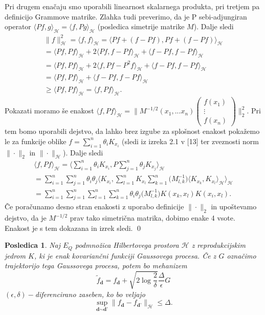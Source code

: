 \documentclass[12pt,a4paper]{amsart}
\theoremstyle{definition} %
\theoremstyle{plain} %
\newtheorem{posledica}[definicija]{Posledica}
\begin{document}
Pri drugem enačaju smo uporabili linearnost skalarnega produkta, pri tretjem pa definicijo Grammove matrike. Zlahka tudi preverimo, da je P sebi-adjungiran operator $\langle Pf, g\rangle_{\mathcal{H}} = \langle f, Pg\rangle_{\mathcal{H}}$ (posledica simetrije matrike $M$). Dalje sledi 
\begin{gather*}
\|f\|_{\mathcal{H}}^2 = \langle f, f\rangle_{\mathcal{H}} = \langle Pf + (f - Pf), Pf + (f - Pf) \rangle_{\mathcal{H}} \\
= \langle Pf, Pf\rangle_{\mathcal{H}} + 2 \langle Pf,f -  Pf\rangle_{\mathcal{H}} + \langle f - Pf, f - Pf\rangle_{\mathcal{H}} \\
= \langle Pf, Pf\rangle_{\mathcal{H}} + 2 \langle f,Pf -  P^2 f\rangle_{\mathcal{H}} + \langle f - Pf, f - Pf\rangle_{\mathcal{H}} \\
= \langle Pf, Pf\rangle_{\mathcal{H}} +  \langle f - Pf, f - Pf\rangle_{\mathcal{H}} \\
\geq \langle Pf, Pf\rangle_{\mathcal{H}} = \langle f, Pf\rangle_{\mathcal{H}}.
\end{gather*}
Pokazati moramo še enakost $\langle f, Pf\rangle_{\mathcal{H}} = \bigg\|M^{-1/2}(x_1,...x_n)
\begin{pmatrix}
  f(x_1)  \\
  \vdots     \\
  f(x_n)
 \end{pmatrix}
\bigg\|_2^2 $. Pri tem bomo uporabili dejstvo, da lahko brez izgube za splošnost enakost pokažemo le za funkcije oblike $f = \sum_{i=1}^{n}\theta_i K_{x_i}$ (sledi iz izreka 2.1 v [13] ter zveznosti norm $\|\cdot\|_2$ in $\|\cdot\|_{\mathcal{H}}$). Dalje sledi 
\begin{gather*}
\langle f, Pf\rangle_{\mathcal{H}} = \big\langle \sum_{i=1}^{n}\theta_i K_{x_i},  P\sum_{j=1}^{n}\theta_j K_{x_j} \big\rangle_{\mathcal{H}} \\
= \sum_{i=1}^n \sum_{j=1}^n \theta_i \theta_j \big\langle K_{x_i}, \sum_{l=1}^n K_{x_l} \sum_{k=1}^n \big(M_{l,k}^{-1}\big)\langle K_{x_k}, K_{x_l}\rangle_{\mathcal{H}}\big\rangle_{\mathcal{H}} \\ = \sum_{i=1}^n \sum_{j=1}^n \sum_{l=1}^n \sum_{k=1}^n \theta_i \theta_j \big(M_{l,k}^{-1}\big) K(x_k, x_l) K(x_i, x_l).
\end{gather*}
Če poračunamo desno stran enakosti z uporabo definicije $\|\cdot\|_2$ in upoštevamo dejstvo, da je $M^{-1/2}$ prav tako simetrična matrika, dobimo enake 4 vsote. Enakost je s tem dokazana in izrek sledi.
\qed
\begin{posledica}
Naj $E_Q$  podmnožica Hilbertovega prostora $\mathcal{H}$ z reprodukcijskim jedrom $K$, ki je enak kovariančni funkciji Gaussovega procesa. Če z $G$ označimo trajektorijo tega Gaussovega procesa, potem bo mehanizem 
$$
\widetilde{f}_{\textbf{d}} = f_{\textbf{d}} + \sqrt{2\log{\frac{2}{\delta}}} \frac{\Delta}{\epsilon}G
$$
$(\epsilon,\delta)-$diferencirano zaseben, ko bo veljajo 
$$
\sup_{\textbf{d} \sim \textbf{d'}} \| f_{\textbf{d}} -  f_{\textbf{d'}} \|_{\mathcal{H}} \leq \Delta.
$$
\end{posledica}
\end{document}
